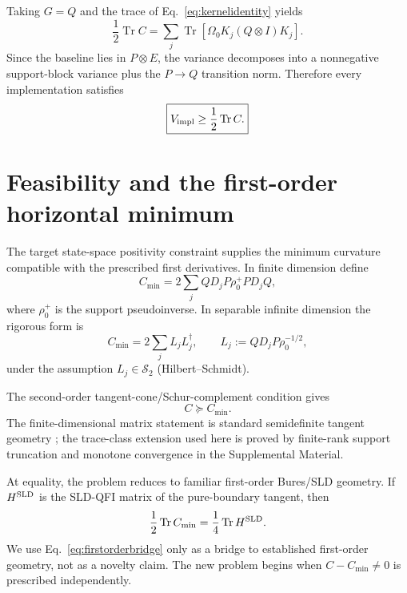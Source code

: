 \documentclass[aps,pra,preprint,nofootinbib]{revtex4-2}
\newcommand{\Tr}{\operatorname{Tr}}
\newcommand{\rhozero}{\rho_0}
\newcommand{\Omegazero}{\Omega_0}
\newcommand{\Vimpl}{V_{\rm impl}}
\newcommand{\Cmin}{C_{\min}}
\newcommand{\Cker}{C}
\begin{document}
Taking $G=Q$ and the trace of Eq.~\eqref{eq:kernelidentity} yields
\begin{equation}
 \frac12\Tr\Cker
 =\sum_j\Tr[\Omegazero K_j(Q\otimes I)K_j].
 \label{eq:kerneltrace}
\end{equation}
Since the baseline lies in $P\otimes E$, the variance decomposes into a nonnegative support-block variance plus the $P\to Q$ transition norm. Therefore every implementation satisfies
\begin{equation}
 \boxed{\Vimpl\ge\frac12\Tr\Cker.}
 \label{eq:universal-lower}
\end{equation}

\section{Feasibility and the first-order horizontal minimum}

The target state-space positivity constraint supplies the minimum curvature compatible with the prescribed first derivatives. In finite dimension define
\begin{equation}
 \Cmin
 =2\sum_j QD_jP\rhozero^+PD_jQ,
 \label{eq:Cmin}
\end{equation}
where $\rhozero^+$ is the support pseudoinverse. In separable infinite dimension the rigorous form is
\begin{equation}
 \Cmin=2\sum_j L_jL_j^\dagger,
 \qquad
 L_j:=QD_jP\rhozero^{-1/2},
 \label{eq:CminHS}
\end{equation}
under the assumption $L_j\in\mathcal S_2$ (Hilbert--Schmidt).

The second-order tangent-cone/Schur-complement condition gives
\begin{equation}
 \boxed{\Cker\succeq\Cmin.}
 \label{eq:feasible}
\end{equation}
The finite-dimensional matrix statement is standard semidefinite tangent geometry \cite{Shapiro1997,BonnansCominettiShapiro1999}; the trace-class extension used here is proved by finite-rank support truncation and monotone convergence in the Supplemental Material.

At equality, the problem reduces to familiar first-order Bures/SLD geometry. If $H^{\rm SLD}$ is the SLD-QFI matrix of the pure-boundary tangent, then
\begin{equation}
 \frac12\Tr\Cmin=\frac14\Tr H^{\rm SLD}.
 \label{eq:firstorderbridge}
\end{equation}
We use Eq.~\eqref{eq:firstorderbridge} only as a bridge to established first-order geometry, not as a novelty claim. The new problem begins when $\Cker-\Cmin\ne0$ is prescribed independently.
\end{document}
